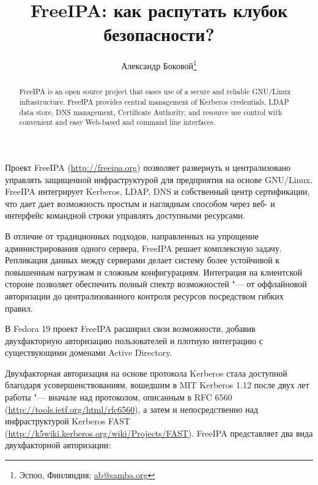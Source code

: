 \documentclass[10pt, a5paper]{article}
\begin{document}
\title{FreeIPA: как распутать клубок безопасности?}%

\author{Александр Боковой\footnote{Эспоо, Финляндия; \url{ab@samba.org}}}
\maketitle

\begin{abstract}
FreeIPA is an open source project that eases use of a secure and reliable GNU/Linux infrastructure. FreeIPA provides central \linebreak management of Kerberos credentials, LDAP data store, DNS management, Certificate Authority, and resource use control with  convenient and easy Web-based and command line interfaces.
\end{abstract}

Проект FreeIPA (\url{http://freeipa.org}) позволяет развернуть и централизовано управлять защищенной инфраструктурой для предприятия на основе GNU/Linux. FreeIPA интегрирует Kerberos, \linebreak LDAP, DNS и собственный центр сертификации, что дает дает возможность  простым и наглядным способом через веб- и интерфейс командной строки управлять доступными ресурсами.

В отличие от традиционных подходов, направленных на упрощение администрирования одного сервера, FreeIPA решает комплексную задачу. Репликация данных между серверами делает систему более устойчивой к повышенным нагрузкам и сложным конфигурациям. Интеграция на клиентской стороне позволяет обеспечить полный спектр возможностей "--- от оффлайновой авторизации до централизованного контроля ресурсов посредством гибких правил.

В Fedora 19 проект FreeIPA расширил свои возможности,  добавив двухфакторную авторизацию пользователей и плотную интеграцию с существующими доменами Active Directory.

Двухфакторная авторизация на основе протокола Kerberos стала доступной благодаря усовершенствованиям, вошедшим в MIT Kerberos 1.12
после двух лет работы "--- вначале над протоколом, описанным в RFC 6560 (\url{http://tools.ietf.org/html/rfc6560}), а затем и непосредственно над инфраструктурой Kerberos FAST \linebreak (\url{http://k5wiki.kerberos.org/wiki/Projects/FAST}). FreeIPA представляет два вида двухфакторной авторизации:
\end{document}
